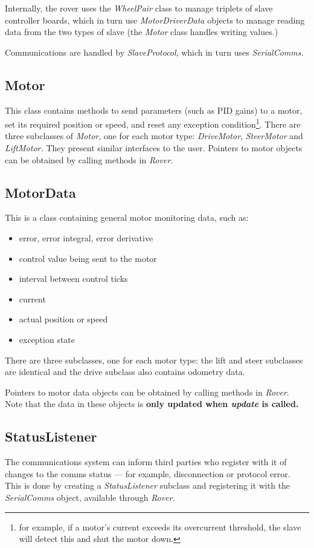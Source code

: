 Internally, the rover uses the \emph{WheelPair} class to manage triplets
of slave controller boards, which in turn use \emph{MotorDriverData} objects
to manage reading data from the two types of slave (the \emph{Motor} class
handles writing values.) 

Communications are handled by \emph{SlaveProtocol}, which in turn uses
\emph{SerialComms.} 

\subsection{Motor}
This class contains methods to send parameters (such as PID gains) to a motor,
set its required position or speed, and reset any exception condition\footnote{for example, if
a motor's current exceeds its overcurrent threshold, the slave will detect this
and shut the motor down.}. There are three subclasses of \emph{Motor}, one
for each motor type: \emph{DriveMotor}, \emph{SteerMotor} and \emph{LiftMotor.} They present similar interfaces to the user.
Pointers to motor objects can be obtained by calling methods in \emph{Rover}.

\subsection{MotorData}
This is a class containing general motor monitoring data, such as:
\begin{itemize}
\item error, error integral, error derivative
\item control value being sent to the motor
\item interval between control ticks
\item current
\item actual position or speed
\item exception state
\end{itemize}
There are three subclasses, one for each motor type: the lift and steer
subclasses are identical and the drive subclass also contains odometry data.

Pointers to motor data objects can be obtained by calling methods in \emph{Rover}.
Note that the data in these objects is \textbf{only updated when \emph{update} is called.} 


\subsection{StatusListener}
The communications system can inform third parties who register with it of changes
to the comms status --- for example, disconnection or protocol error. This is done
by creating a \emph{StatusListener} subclass and registering it with the \emph{SerialComms} 
object, available through \emph{Rover.} 

